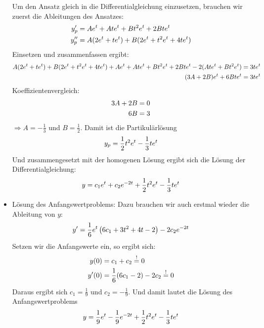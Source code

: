 \documentclass{article}
\begin{document}
\begin{itemize}
		Um den Ansatz gleich in die Differentialgleichung einzusetzen, brauchen wir zuerst die Ableitungen des Ansatzes:
		\begin{align}
			y_p' &= Ae^t + Ate^t + Bt^2e^t + 2Bte^t \notag \\
			y_p'' &= A(2e^t + te^t) + B(2e^t + t^2e^t + 4te^t) \notag
		\end{align}
		Einsetzen und zusammenfassen ergibt:
		\begin{align}
			A(2e^t + te^t) + B(2e^t + t^2e^t + 4te^t) + Ae^t + Ate^t + Bt^2e^t + 2Bte^t - 2(Ate^t + Bt^2e^t) &= 3te^t \notag \\
			(3A + 2B)e^t + 6Bte^t &= 3te^t \notag
		\end{align}
		Koeffizientenvergleich:
		\begin{align}
			3A + 2B &= 0 \notag \\
			6B &= 3 \notag
		\end{align}
		$\Rightarrow A = -\frac{1}{3}$ und $B=\frac{1}{2}$. Damit ist die Partikulärlösung
		\begin{align}
			y_p = \frac{1}{2}t^2e^t - \frac{1}{3}te^t \notag
		\end{align}
		Und zusammengesetzt mit der homogenen Lösung ergibt sich die Lösung der Differentialgleichung:
		\begin{align}
			y = c_1e^t + c_2e^{-2t} + \frac{1}{2}t^2e^t - \frac{1}{3}te^t \notag
		\end{align}
		\item Lösung des Anfangswertproblems: Dazu brauchen wir auch erstmal wieder die Ableitung von $y$:
		\begin{align}
			y' = \frac{1}{6}e^t\left(6c_1 + 3t^2 + 4t - 2\right) - 2c_2e^{-2t} \notag
		\end{align}
		Setzen wir die Anfangswerte ein, so ergibt sich:
		\begin{align}
			y(0) &= c_1 + c_2 \overset{!}{=} 0 \notag \\
			y'(0) &= \frac{1}{6}(6c_1 - 2) - 2c_2 \overset{!}{=} 0 \notag
		\end{align}
		Daraus ergibt sich $c_1 = \frac{1}{9}$ und $c_2=-\frac{1}{9}$. Und damit lautet die Lösung des Anfangswertproblems
		\begin{align}
			y = \frac{1}{9}e^t - \frac{1}{9}e^{-2t} + \frac{1}{2}t^2e^t - \frac{1}{3}te^t \notag
		\end{align}
	\end{itemize}
\end{document}
